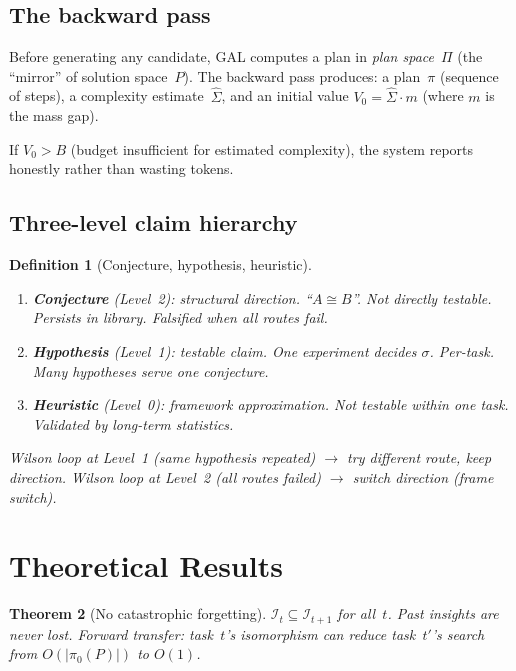 \documentclass{article}
\newtheorem{theorem}{Theorem}
\newtheorem{definition}[theorem]{Definition}
\newcommand{\calI}{\mathcal{I}}
\begin{document}
\subsection{The backward pass}

Before generating any candidate, GAL computes a plan in
\emph{plan space}~$\Pi$ (the ``mirror'' of solution space~$P$).
The backward pass produces: a plan~$\pi$ (sequence of steps),
a complexity estimate~$\hat\Sigma$, and an initial value
$V_0 = \hat\Sigma \cdot m$ (where $m$ is the mass gap).

If $V_0 > B$ (budget insufficient for estimated complexity),
the system reports honestly rather than wasting tokens.

\subsection{Three-level claim hierarchy}

\begin{definition}[Conjecture, hypothesis, heuristic]%
\label{def:three-levels}
\begin{enumerate}[nosep]
  \item \textbf{Conjecture} (Level~2): structural direction.
    ``$A \cong B$''.  Not directly testable.
    Persists in library.  Falsified when all routes fail.
  \item \textbf{Hypothesis} (Level~1): testable claim.
    One experiment decides $\sigma$.
    Per-task.  Many hypotheses serve one conjecture.
  \item \textbf{Heuristic} (Level~0): framework approximation.
    Not testable within one task.
    Validated by long-term statistics.
\end{enumerate}
Wilson loop at Level~1 (same hypothesis repeated) $\to$
try different route, keep direction.
Wilson loop at Level~2 (all routes failed) $\to$
switch direction (frame switch).
\end{definition}

\section{Theoretical Results}\label{sec:theory}

\begin{theorem}[No catastrophic forgetting]\label{thm:no-forgetting}
$\calI_t \subseteq \calI_{t+1}$ for all~$t$.
Past insights are never lost.  Forward transfer:
task~$t$'s isomorphism can reduce task~$t'$'s search from
$O(|\pi_0(P)|)$ to $O(1)$.
\end{theorem}
\end{document}
